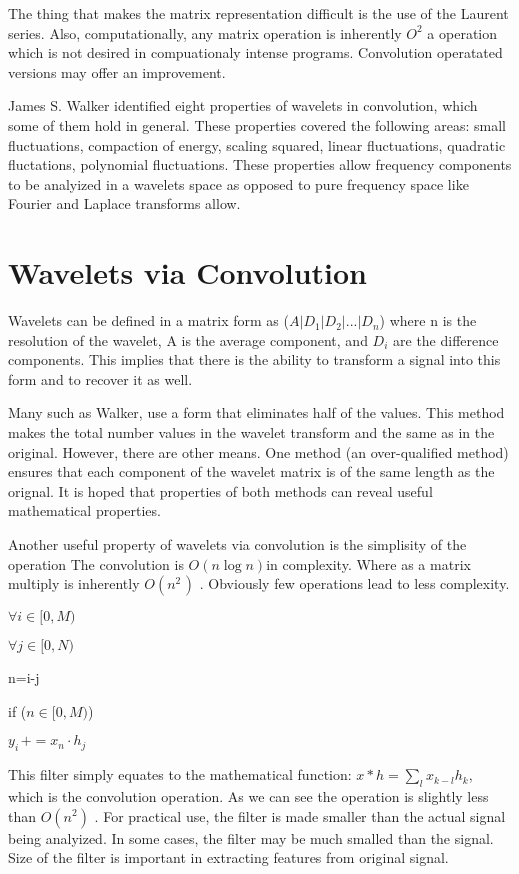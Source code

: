 \documentclass{article}
\begin{document}
The thing that makes the matrix representation difficult is the use of the
Laurent series. Also, computationally, any matrix operation is inherently $%
O^{2}$ a operation which is not desired in compuationaly intense programs.
Convolution operatated versions may offer an improvement.

James S. Walker identified eight properties of wavelets in convolution,
which some of them hold in general. These properties covered the following
areas: small fluctuations, compaction of energy, scaling squared, linear
fluctuations, quadratic fluctations, polynomial fluctuations. These
properties allow frequency components to be analyized in a wavelets space as
opposed to pure frequency space like Fourier and Laplace transforms allow.

\section{Wavelets via Convolution}

Wavelets can be defined in a matrix form as ($A|D_{1}|D_{2}|...|D_{n}$)
where n is the resolution of the wavelet, A is the average component, and $%
D_{i}$ are the difference components. This implies that there is the ability
to transform a signal into this form and to recover it as well.

Many such as Walker, use a form that eliminates half of the values. This
method makes the total number values in the wavelet transform and the same
as in the original. However, there are other means. One method (an
over-qualified method) ensures that each component of the wavelet matrix is
of the same length as the orignal. It is hoped that properties of both
methods can reveal useful mathematical properties.

Another useful property of wavelets via convolution is the simplisity of the
operation The convolution is $O\left( n\log n\right) $in complexity. Where
as a matrix multiply is inherently $O(n^{2\,})$ . Obviously few operations
lead to less complexity.

$\forall i\in \lbrack 0,M)$

\qquad $\forall j\in \lbrack 0,N)$

\qquad \qquad n=i-j

\qquad \qquad if ($n\in \lbrack 0,M)$)

\qquad \qquad \qquad $y_{i\,}+=x_{n}\cdot h_{j\,}$

This filter simply equates to the mathematical function: $x\ast
h=\sum_{l}x_{k-l}h_{k}$, which is the convolution operation. As we can see
the operation is slightly less than $O(n^{2})$ . For practical use, the
filter is made smaller than the actual signal being analyized. In some
cases, the filter may be much smalled than the signal. Size of the filter is
important in extracting features from original signal.
\end{document}
